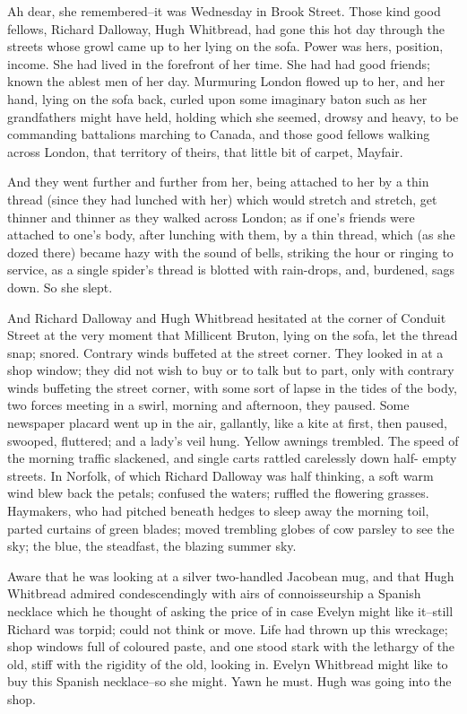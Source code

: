 \documentclass[lang=cn,10pt]{elegantbook}
\begin{document}
Ah dear, she remembered--it was Wednesday in Brook Street.  Those
kind good fellows, Richard Dalloway, Hugh Whitbread, had gone this
hot day through the streets whose growl came up to her lying on the
sofa.  Power was hers, position, income.  She had lived in the
forefront of her time.  She had had good friends; known the ablest
men of her day.  Murmuring London flowed up to her, and her hand,
lying on the sofa back, curled upon some imaginary baton such as
her grandfathers might have held, holding which she seemed, drowsy
and heavy, to be commanding battalions marching to Canada, and
those good fellows walking across London, that territory of theirs,
that little bit of carpet, Mayfair.

And they went further and further from her, being attached to her
by a thin thread (since they had lunched with her) which would
stretch and stretch, get thinner and thinner as they walked across
London; as if one's friends were attached to one's body, after
lunching with them, by a thin thread, which (as she dozed there)
became hazy with the sound of bells, striking the hour or ringing
to service, as a single spider's thread is blotted with rain-drops,
and, burdened, sags down.  So she slept.

And Richard Dalloway and Hugh Whitbread hesitated at the corner of
Conduit Street at the very moment that Millicent Bruton, lying on
the sofa, let the thread snap; snored.  Contrary winds buffeted at
the street corner.  They looked in at a shop window; they did not
wish to buy or to talk but to part, only with contrary winds
buffeting the street corner, with some sort of lapse in the tides
of the body, two forces meeting in a swirl, morning and afternoon,
they paused.  Some newspaper placard went up in the air, gallantly,
like a kite at first, then paused, swooped, fluttered; and a lady's
veil hung.  Yellow awnings trembled.  The speed of the morning
traffic slackened, and single carts rattled carelessly down half-
empty streets.  In Norfolk, of which Richard Dalloway was half
thinking, a soft warm wind blew back the petals; confused the
waters; ruffled the flowering grasses.  Haymakers, who had pitched
beneath hedges to sleep away the morning toil, parted curtains of
green blades; moved trembling globes of cow parsley to see the sky;
the blue, the steadfast, the blazing summer sky.

Aware that he was looking at a silver two-handled Jacobean mug, and
that Hugh Whitbread admired condescendingly with airs of
connoisseurship a Spanish necklace which he thought of asking the
price of in case Evelyn might like it--still Richard was torpid;
could not think or move.  Life had thrown up this wreckage; shop
windows full of coloured paste, and one stood stark with the
lethargy of the old, stiff with the rigidity of the old, looking
in.  Evelyn Whitbread might like to buy this Spanish necklace--so
she might.  Yawn he must.  Hugh was going into the shop.
\end{document}
